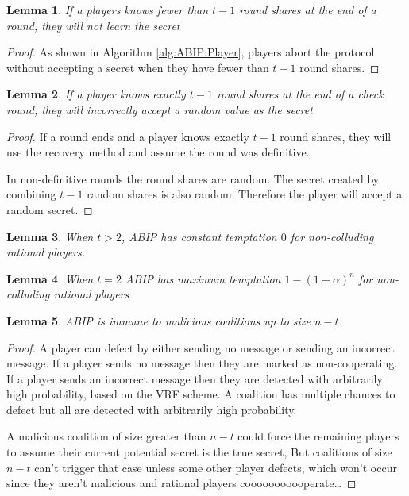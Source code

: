 \documentclass{dalcsthesis}
\newtheorem{lemma}{Lemma}
\begin{document}
\begin{lemma} If a players knows fewer than $t-1$ round shares at the end of a round, they will not learn the secret \label{Lem:ABIP:FewSharesNolearn} \end{lemma}
\begin{proof}
As shown in Algorithm \ref{alg:ABIP:Player}, players abort the protocol without accepting a secret when they have fewer than $t-1$ round shares. 
\end{proof}

\begin{lemma} If a player knows exactly $t-1$ round shares at the end of a check round, they will incorrectly accept a random value as the secret \end{lemma}
\begin{proof}
If a round ends and a player knows exactly $t-1$ round shares, they will use the recovery method and assume the round was definitive.

In non-definitive rounds the round shares are random. The secret created by combining $t-1$ random shares is also random. Therefore the player will accept a random secret.  
\end{proof}

\begin{lemma} When $t > 2$, ABIP has constant temptation $0$ for non-colluding rational players. \end{lemma}

\begin{lemma} When $t = 2$ ABIP has maximum temptation $1 - (1 - \alpha)^n$ for non-colluding rational players \end{lemma}

\begin{lemma} ABIP is immune to malicious coalitions up to size $n-t$ \end{lemma}
\begin{proof}
A player can defect by either sending no message or sending an incorrect message. If a player sends no message then they are marked as non-cooperating. If a player sends an incorrect message then they are detected with arbitrarily high probability, based on the VRF scheme. A coalition has multiple chances to defect but all are detected with arbitrarily high probability.

A malicious coalition of size greater than $n-t$ could force the remaining players to assume their current potential secret is the true secret, But coalitions of size $n-t$ can't trigger that case unless some other player defects, which won't occur since they aren't malicious and rational players cooooooooooperate\ldots
\end{proof}
\end{document}
